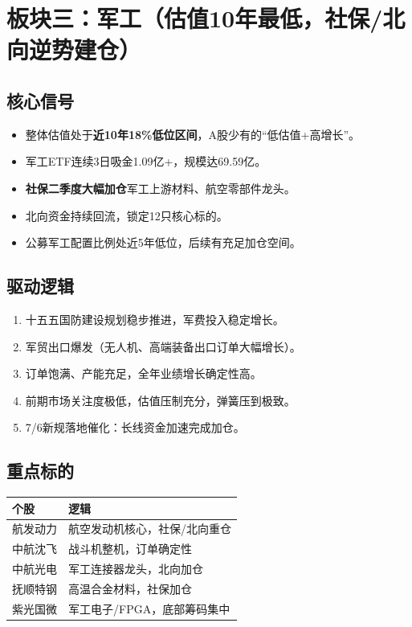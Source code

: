\documentclass[a4paper,11pt,fontset=none]{ctexart}
\begin{document}
\section{板块三：军工（估值10年最低，社保/北向逆势建仓）}

\subsection*{核心信号}
\begin{itemize}
  \item 整体估值处于\textbf{近10年18\%低位区间}，A股少有的``低估值+高增长''。
  \item 军工ETF连续3日吸金1.09亿+，规模达69.59亿。
  \item \textbf{社保二季度大幅加仓}军工上游材料、航空零部件龙头。
  \item 北向资金持续回流，锁定12只核心标的。
  \item 公募军工配置比例处近5年低位，后续有充足加仓空间。
\end{itemize}

\subsection*{驱动逻辑}
\begin{enumerate}
  \item 十五五国防建设规划稳步推进，军费投入稳定增长。
  \item 军贸出口爆发（无人机、高端装备出口订单大幅增长）。
  \item 订单饱满、产能充足，全年业绩增长确定性高。
  \item 前期市场关注度极低，估值压制充分，弹簧压到极致。
  \item 7/6新规落地催化：长线资金加速完成加仓。
\end{enumerate}

\subsection*{重点标的}
\begin{tabularx}{\textwidth}{L{3cm}X}
\toprule
\textbf{个股} & \textbf{逻辑} \\
\midrule
航发动力 & 航空发动机核心，社保/北向重仓 \\
中航沈飞 & 战斗机整机，订单确定性 \\
中航光电 & 军工连接器龙头，北向加仓 \\
抚顺特钢 & 高温合金材料，社保加仓 \\
紫光国微 & 军工电子/FPGA，底部筹码集中 \\
\bottomrule
\end{tabularx}
\end{document}
